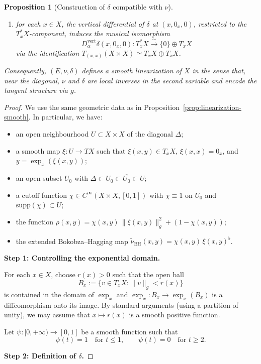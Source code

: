 \documentclass{amsart}
\newcounter{thm}
\newcounter{ex}
\newcounter{re}
\newtheorem{Proposition}[thm]{Proposition}
\begin{document}
{\begin{Proposition}[Construction of $\delta$ compatible with $\nu$]
\begin{enumerate}
  \item[(iii)] for each $x\in X$, the vertical differential of $\delta$
  at $(x,0_x,0)$, restricted to the $T_x^\ast X$-component, induces the
  musical isomorphism
  \[
    D^{\mathrm{vert}}_\alpha\delta(x,0_x,0)
    : T_x^\ast X \xrightarrow{\ \sim\ } \{0\}\oplus T_xX
  \]
  via the identification $T_{(x,x)}(X\times X) \simeq T_xX\oplus T_xX$.
\end{enumerate}
Consequently, $(E,\nu,\delta)$ defines a smooth linearization of $X$ in the
sense that, near the diagonal, $\nu$ and $\delta$ are local inverses in the
second variable and encode the tangent structure via $g$.
\end{Proposition}

\begin{proof}
We use the same geometric data as in
Proposition~\ref{prop:linearization-smooth}. In particular, we have:
\begin{itemize}
  \item an open neighbourhood $U\subset X\times X$ of the diagonal
  $\Delta$;
  \item a smooth map $\xi:U\to TX$ such that
  $\xi(x,y)\in T_xX$, $\xi(x,x)=0_x$, and $y=\exp_x(\xi(x,y))$;
  \item an open subset $U_0$ with 
  $\Delta\subset U_0\subset\overline{U_0}\subset U$;
  \item a cutoff function $\chi\in C^\infty(X\times X,[0,1])$ with
  $\chi\equiv 1$ on $U_0$ and $\mathrm{supp}(\chi)\subset U$;
  \item the function $\rho(x,y)=\chi(x,y)\,\|\xi(x,y)\|_g^2+(1-\chi(x,y))$;
  \item the extended Bokobza--Haggiag map 
  $\widetilde{\nu}_{\mathrm{BH}}(x,y)=\chi(x,y)\,\xi(x,y)^\flat$.
\end{itemize}

\medskip
\noindent\textbf{Step 1: Controlling the exponential domain.}

For each $x\in X$, choose $r(x)>0$ such that the open ball
\[
B_x := \{v\in T_xX : \|v\|_g < r(x)\}
\]
is contained in the domain of $\exp_x$ and $\exp_x:B_x\to \exp_x(B_x)$
is a diffeomorphism onto its image. By standard arguments (using a partition
of unity), we may assume that $x\mapsto r(x)$ is a smooth positive function.

Let $\psi:[0,+\infty)\to[0,1]$ be a smooth function such that
\[
\psi(t) = 1 \quad\text{for } t\le 1,
\qquad
\psi(t) = 0 \quad\text{for } t\ge 2.
\]

\medskip
\noindent\textbf{Step 2: Definition of $\delta$.}


\end{proof}}
\end{document}
